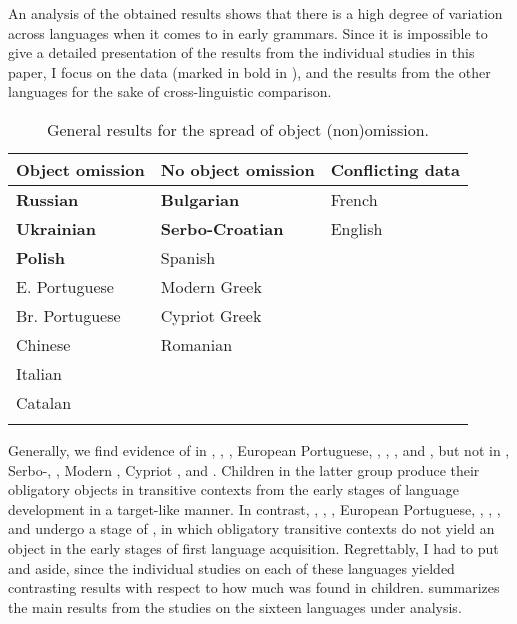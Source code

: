 \documentclass[output=paper,modfonts,newtxmath,hidelinks,]{langscibook}
\begin{document}
An analysis of the obtained results shows that there is a high degree of variation across languages when it comes to  in early grammars. Since it is impossible to give a detailed presentation of the results from the individual studies in this paper, I focus on the  data (marked in bold in ), and  the results from the other languages for the sake of cross-linguistic comparison.\largerpage[2]

\begin{table}[h]
    \caption{General results for the spread of object (non)omission.}
\begin{center}
    \begin{tabularx}{0.85\linewidth}{XXX}
    \lsptoprule
     \textbf{Object omission} & \textbf{No object omission} & \textbf{Conflicting data}\\ \midrule
    \textbf{Russian} & \textbf{Bulgarian} & {French} \\ 
    \textbf{Ukrainian} & \textbf{Serbo-Croatian} & {English} \\ 
    \textbf{Polish} & {Spanish} &  \\ 
    E. Portuguese & Modern {Greek} & \\ 
    Br. Portuguese & Cypriot {Greek} & \\ 
    {Chinese} & {Romanian} & \\ 
    {Italian} & & \\ 
    {Catalan} & & \\ \lspbottomrule
    \end{tabularx}
\end{center}
\label{17:table:table_2}
\end{table}

Generally, we find evidence of  in , , , European Portuguese, , , , and , but not in , Serbo-, , Modern , Cypriot , and . Children in the latter group produce their obligatory objects in transitive contexts from the early stages of language development in a target-like manner. In contrast, , , , European Portuguese, , , , and  undergo a stage of , in which obligatory transitive contexts do not yield an object in the early stages of first language acquisition. Regrettably, I had to put  and  aside, since the individual studies on each of these languages yielded contrasting results with respect to how much  was found in children.  summarizes the main results from the studies on the sixteen languages under analysis.\largerpage
\end{document}
